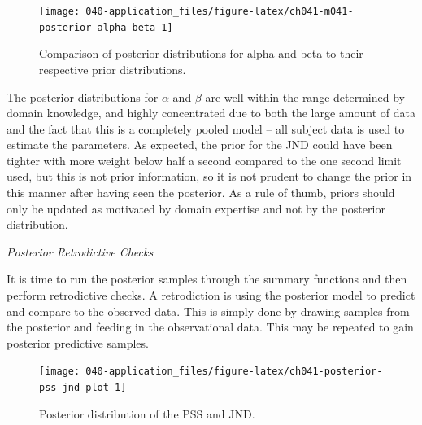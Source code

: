 \documentclass[11pt, oneside, openany]{scrbook}
\newenvironment{Shaded}{\begin{snugshade}}{\end{snugshade}}
\newcommand{\FloatTok}[1]{\textcolor[rgb]{0.00,0.00,0.81}{#1}}
\newcommand{\FunctionTok}[1]{\textcolor[rgb]{0.00,0.00,0.00}{#1}}
\newcommand{\NormalTok}[1]{#1}
\newcommand{\OtherTok}[1]{\textcolor[rgb]{0.56,0.35,0.01}{#1}}
\newcommand{\SpecialCharTok}[1]{\textcolor[rgb]{0.00,0.00,0.00}{#1}}
\begin{document}
\begin{figure}

{\centering \texttt{[image: 040-application\_files/figure-latex/ch041-m041-posterior-alpha-beta-1]} 

}

\caption{Comparison of posterior distributions for alpha and beta to their respective prior distributions.}\label{fig:ch041-m041-posterior-alpha-beta}
\end{figure}

The posterior distributions for \(\alpha\) and \(\beta\) are well within the range determined by domain knowledge, and highly concentrated due to both the large amount of data and the fact that this is a completely pooled model -- all subject data is used to estimate the parameters. As expected, the prior for the JND could have been tighter with more weight below half a second compared to the one second limit used, but this is not prior information, so it is not prudent to change the prior in this manner after having seen the posterior. As a rule of thumb, priors should only be updated as motivated by domain expertise and not by the posterior distribution.

\emph{Posterior Retrodictive Checks}

It is time to run the posterior samples through the summary functions and then perform retrodictive checks. A retrodiction is using the posterior model to predict and compare to the observed data. This is simply done by drawing samples from the posterior and feeding in the observational data. This may be repeated to gain posterior predictive samples.


\begin{Shaded}
\end{Shaded}


\begin{figure}

{\centering \texttt{[image: 040-application\_files/figure-latex/ch041-posterior-pss-jnd-plot-1]} 

}

\caption{Posterior distribution of the PSS and JND.}\label{fig:ch041-posterior-pss-jnd-plot}
\end{figure}
\end{document}
